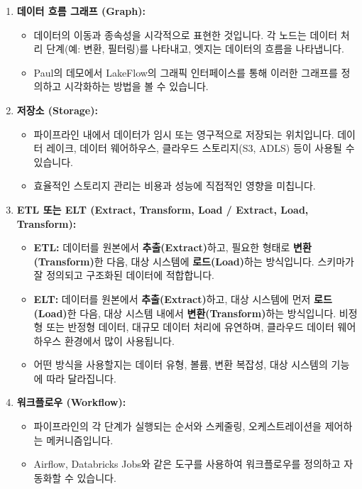 \documentclass[11pt,a4paper]{article}
\begin{document}
\begin{enumerate}
\begin{enumerate}
    \item \textbf{데이터 흐름 그래프 (Graph):}
    \begin{itemize}
        \item 데이터의 이동과 종속성을 시각적으로 표현한 것입니다. 각 노드는 데이터 처리 단계(예: 변환, 필터링)를 나타내고, 엣지는 데이터의 흐름을 나타냅니다.
        \item Paul의 데모에서 LakeFlow의 그래픽 인터페이스를 통해 이러한 그래프를 정의하고 시각화하는 방법을 볼 수 있습니다.
    \end{itemize}

    \item \textbf{저장소 (Storage):}
    \begin{itemize}
        \item 파이프라인 내에서 데이터가 임시 또는 영구적으로 저장되는 위치입니다. 데이터 레이크, 데이터 웨어하우스, 클라우드 스토리지(S3, ADLS) 등이 사용될 수 있습니다.
        \item 효율적인 스토리지 관리는 비용과 성능에 직접적인 영향을 미칩니다.
    \end{itemize}

    \item \textbf{ETL 또는 ELT (Extract, Transform, Load / Extract, Load, Transform):}
    \begin{itemize}
        \item \textbf{ETL:} 데이터를 원본에서 \textbf{추출(Extract)}하고, 필요한 형태로 \textbf{변환(Transform)}한 다음, 대상 시스템에 \textbf{로드(Load)}하는 방식입니다. 스키마가 잘 정의되고 구조화된 데이터에 적합합니다.
        \item \textbf{ELT:} 데이터를 원본에서 \textbf{추출(Extract)}하고, 대상 시스템에 먼저 \textbf{로드(Load)}한 다음, 대상 시스템 내에서 \textbf{변환(Transform)}하는 방식입니다. 비정형 또는 반정형 데이터, 대규모 데이터 처리에 유연하며, 클라우드 데이터 웨어하우스 환경에서 많이 사용됩니다.
        \item 어떤 방식을 사용할지는 데이터 유형, 볼륨, 변환 복잡성, 대상 시스템의 기능에 따라 달라집니다.
    \end{itemize}

    \item \textbf{워크플로우 (Workflow):}
    \begin{itemize}
        \item 파이프라인의 각 단계가 실행되는 순서와 스케줄링, 오케스트레이션을 제어하는 메커니즘입니다.
        \item Airflow, Databricks Jobs와 같은 도구를 사용하여 워크플로우를 정의하고 자동화할 수 있습니다.
    \end{itemize}


\end{enumerate}
\end{enumerate}
\end{document}
